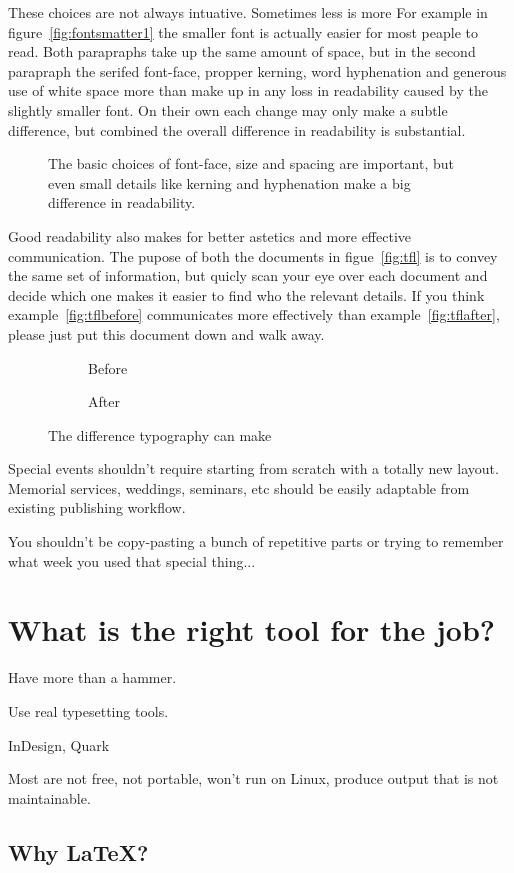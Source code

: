 \documentclass[12pt]{scrartcl}
\newcommand{\pdfsample}[4]{%
		\begin{figure}[h]
			\centering
			\begin{minipage}[b]{.45\textwidth}
				\raggedleft
				\shadowbox{\texttt{[image: \#2]}}
			\end{minipage}\hspace{2\columnsep}
			\begin{minipage}[b]{.45\textwidth}
				\caption{#3}
				\label{fig:#4}
				\vspace{1ex}
			\end{minipage}
		\end{figure}
	}
\newcommand{\pdfcompare}[5]{%
		\begin{figure}[h]
			\centering
			\begin{subfigure}[b]{0.45\textwidth}
				\shadowbox{\texttt{[image: \#2]}}
				\caption{Before}
				\label{fig:#5before}
			\end{subfigure}\quad%
			\begin{subfigure}[b]{0.45\textwidth}
				\shadowbox{\texttt{[image: \#3]}}
				\caption{After}
				\label{fig:#5after}
			\end{subfigure}
			\caption{#4}
			\label{fig:#5}
		\end{figure}
	}
\begin{document}
These choices are not always intuative. Sometimes less is more For example in
figure~\vref{fig:fontsmatter1} the smaller font is actually easier for most
peaple to read. Both parapraphs take up the same amount of space, but in the
second parapraph the serifed font-face, propper kerning, word hyphenation and
generous use of white space more than make up in any loss in readability caused
by the slightly smaller font. On their own each change may only make a subtle
difference, but combined the overall difference in readability is substantial.

\pdfsample{1}{../gallery/fontsmatter.pdf}{The basic choices of font-face, size and spacing are
			important, but even small details like kerning and hyphenation make a big
			difference in readability.}{fontsmatter1}

Good readability also makes for better astetics and more effective
communication. The pupose of both the documents in figue~\vref{fig:tfl} is to convey
the same set of information, but quicly scan your eye over each document and
decide which one makes it easier to find who the relevant details. If you think
example~\vref{fig:tflbefore} communicates more effectively than
example~\vref{fig:tflafter}, please just put this document down and walk away.

\pdfcompare{1}{../gallery/tfl_sample_pleading_before.pdf}{../gallery/tfl_sample_pleading_after.pdf}{The difference typography can make\cite{tflpleading}}{tfl}

Special events shouldn't require starting from scratch with a totally new
layout. Memorial services, weddings, seminars, etc should be easily adaptable
from existing publishing workflow.

You shouldn't be copy-pasting a bunch of repetitive parts or trying to remember
what week you used that special thing...

\section{What is the right tool for the job?}

Have more than a hammer.

Use real typesetting tools.

InDesign, Quark

Most are not free, not portable, won't run on Linux, produce output that is not
maintainable.

\subsection{Why \LaTeX?}
\end{document}
